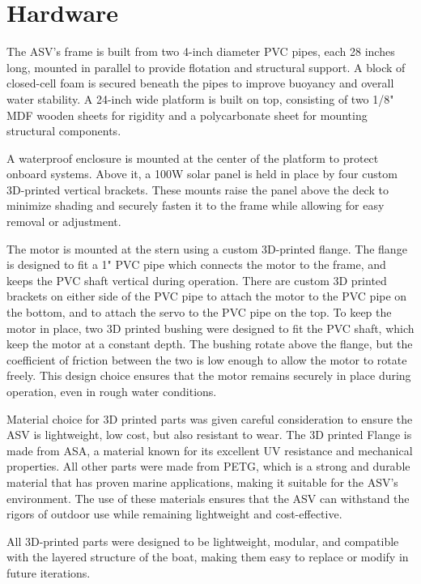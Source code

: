 \section{Hardware}

The ASV's frame is built from two 4-inch diameter PVC pipes, each 28 inches long, mounted in parallel to provide flotation and structural support. A block of closed-cell foam is secured beneath the pipes to improve buoyancy and overall water stability. A 24-inch wide platform is built on top, consisting of two 1/8" MDF wooden sheets for rigidity and a polycarbonate sheet for mounting structural components. 

A waterproof enclosure is mounted at the center of the platform to protect onboard systems. Above it, a 100W solar panel is held in place by four custom 3D-printed vertical brackets. These mounts raise the panel above the deck to minimize shading and securely fasten it to the frame while allowing for easy removal or adjustment.

The motor is mounted at the stern using a custom 3D-printed flange. The flange is designed to fit a 1" PVC pipe which connects the motor to the frame, and keeps the PVC shaft vertical during operation. There are custom 3D printed brackets on either side of the PVC pipe to attach the motor to the PVC pipe on the bottom, and to attach the servo to the PVC pipe on the top. To keep the motor in place, two 3D printed bushing were designed to fit the PVC shaft, which keep the motor at a constant depth. The bushing rotate above the flange, but the coefficient of friction between the two is low enough to allow the motor to rotate freely. This design choice ensures that the motor remains securely in place during operation, even in rough water conditions.

Material choice for 3D printed parts was given careful consideration to ensure the ASV is lightweight, low cost, but also resistant to wear. The 3D printed Flange is made from ASA, a material known for its excellent UV resistance and mechanical properties. All other parts were made from PETG, which is a strong and durable material that has proven marine applications, making it suitable for the ASV's environment. The use of these materials ensures that the ASV can withstand the rigors of outdoor use while remaining lightweight and cost-effective.

All 3D-printed parts were designed to be lightweight, modular, and compatible with the layered structure of the boat, making them easy to replace or modify in future iterations.

